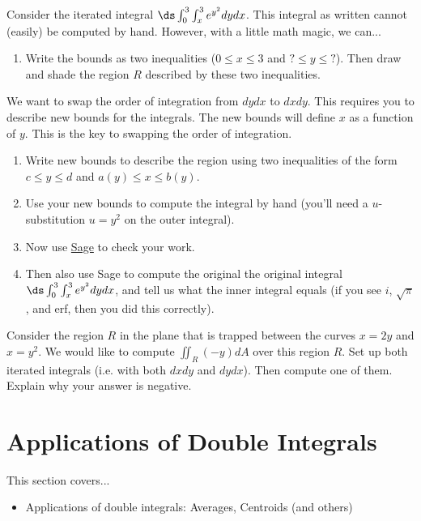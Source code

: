 \begin{problem}
Consider the iterated integral $\ds \int_0^3\int_x^3 e^{y^2}dydx$. This integral as written cannot (easily) be computed by hand. However, with a little math magic, we can...
\begin{enumerate}
	\item Write the bounds as two inequalities ($0\leq x\leq 3$ and $?\leq y\leq ?$). Then draw and shade the region $R$ described by these two inequalities.
\end{enumerate}
We want to swap the order of integration from $dydx$ to $dxdy$. This requires you to describe new bounds for the integrals. The new bounds will define $x$ as a function of $y$. This is the key to swapping the order of integration. 
\begin{enumerate}[resume]
	\item Write new bounds to describe the region using two inequalities of the form $c\leq y\leq d$ and $a(y)\leq x\leq b(y)$.
	\item Use your new bounds to compute the integral by hand (you'll need a $u$-substitution $u=y^2$ on the outer integral). 
	\item Now use \href{http://bmw.byuimath.com/dokuwiki/doku.php?id=double_integral_calculator}{Sage} to check your work. 
	\item Then also use Sage to compute the original the original integral $\ds \int_0^3\int_x^3 e^{y^2}dydx$, and tell us what the inner integral equals (if you see $i$, $\sqrt{\pi}$, and erf, then you did this correctly).
\end{enumerate}
\end{problem}

%

\begin{challenge}
Consider the region $R$ in the plane that is trapped between the curves $x=2y$ and $x=y^2$.  We would like to compute $\iint_R (-y) dA$ over this region $R$.  Set up both iterated integrals (i.e. with both $dxdy$ and $dydx$). Then compute one of them. Explain why your answer is negative.
\end{challenge}



\section{Applications of Double Integrals}
This section covers...
\begin{itemize}
\item Applications of double integrals: Averages, Centroids (and others)
\end{itemize}

